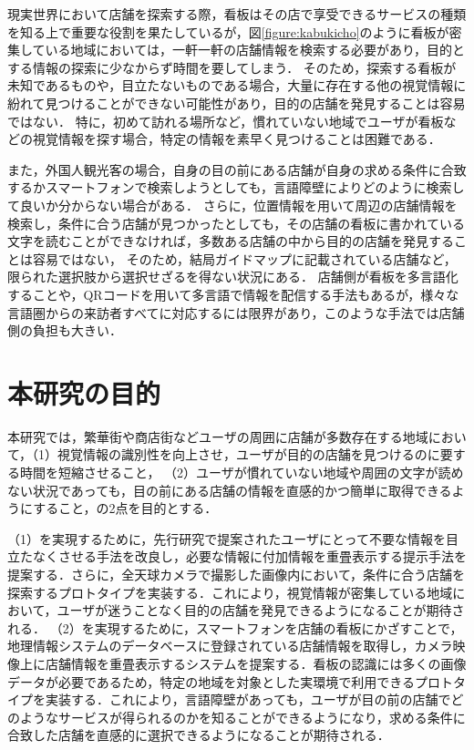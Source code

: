   現実世界において店舗を探索する際，看板はその店で享受できるサービスの種類を知る上で重要な役割を果たしているが，図\ref{figure:kabukicho}のように看板が密集している地域においては，一軒一軒の店舗情報を検索する必要があり，目的とする情報の探索に少なからず時間を要してしまう．
  そのため，探索する看板が未知であるものや，目立たないものである場合，大量に存在する他の視覚情報に紛れて見つけることができない可能性があり，目的の店舗を発見することは容易ではない．
  特に，初めて訪れる場所など，慣れていない地域でユーザが看板などの視覚情報を探す場合，特定の情報を素早く見つけることは困難である．

  また，外国人観光客の場合，自身の目の前にある店舗が自身の求める条件に合致するかスマートフォンで検索しようとしても，言語障壁によりどのように検索して良いか分からない場合がある．
  さらに，位置情報を用いて周辺の店舗情報を検索し，条件に合う店舗が見つかったとしても，その店舗の看板に書かれている文字を読むことができなければ，多数ある店舗の中から目的の店舗を発見することは容易ではない，
  そのため，結局ガイドマップに記載されている店舗など，限られた選択肢から選択せざるを得ない状況にある．
  店舗側が看板を多言語化することや，QRコードを用いて多言語で情報を配信する手法もあるが，様々な言語圏からの来訪者すべてに対応するには限界があり，このような手法では店舗側の負担も大きい．

\section{本研究の目的}
\label{section:purpose}
  本研究では，繁華街や商店街などユーザの周囲に店舗が多数存在する地域において，（1）視覚情報の識別性を向上させ，ユーザが目的の店舗を見つけるのに要する時間を短縮させること，
  （2）ユーザが慣れていない地域や周囲の文字が読めない状況であっても，目の前にある店舗の情報を直感的かつ簡単に取得できるようにすること，の2点を目的とする．

  （1）を実現するために，先行研究\cite{Fujita:2013}で提案されたユーザにとって不要な情報を目立たなくさせる手法を改良し，必要な情報に付加情報を重畳表示する提示手法を提案する．さらに，全天球カメラで撮影した画像内において，条件に合う店舗を探索するプロトタイプを実装する．これにより，視覚情報が密集している地域において，ユーザが迷うことなく目的の店舗を発見できるようになることが期待される．
  （2）を実現するために，スマートフォンを店舗の看板にかざすことで，地理情報システムのデータベースに登録されている店舗情報を取得し，カメラ映像上に店舗情報を重畳表示するシステムを提案する．看板の認識には多くの画像データが必要であるため，特定の地域を対象とした実環境で利用できるプロトタイプを実装する．これにより，言語障壁があっても，ユーザが目の前の店舗でどのようなサービスが得られるのかを知ることができるようになり，求める条件に合致した店舗を直感的に選択できるようになることが期待される．

